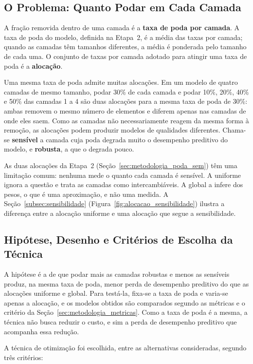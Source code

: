 \subsection{O Problema: Quanto Podar em Cada Camada}

A fração removida dentro de uma camada é a \textbf{taxa de poda por camada}. A taxa de poda
do modelo, definida na Etapa~2, é a média das taxas por camada; quando as camadas têm
tamanhos diferentes, a média é ponderada pelo tamanho de cada uma. O conjunto de taxas por
camada adotado para atingir uma taxa de poda é a \textbf{alocação}.

Uma mesma taxa de poda admite muitas alocações. Em um modelo de quatro camadas de mesmo
tamanho, podar 30\% de cada camada e podar 10\%, 20\%, 40\% e 50\% das camadas 1 a 4 são
duas alocações para a mesma taxa de poda de 30\%: ambas removem o mesmo número de elementos
e diferem apenas nas camadas de onde eles saem. Como as camadas não necessariamente reagem
da mesma forma à remoção, as alocações podem produzir modelos de qualidades diferentes.
Chama-se \textbf{sensível} a camada cuja poda degrada muito o desempenho preditivo do
modelo, e \textbf{robusta}, a que o degrada pouco.

As duas alocações da Etapa~2 (Seção~\ref{sec:metodologia_poda_sem}) têm uma limitação
comum: nenhuma mede o quanto cada camada é sensível. A uniforme ignora a questão e trata as
camadas como intercambiáveis. A global a infere dos pesos, o que é uma aproximação, e não
uma medida. A Seção~\ref{subsec:sensibilidade} (Figura~\ref{fig:alocacao_sensibilidade})
ilustra a diferença entre a alocação uniforme e uma alocação que segue a sensibilidade.

\subsection{Hipótese, Desenho e Critérios de Escolha da Técnica}

A hipótese é a de que podar mais as camadas robustas e menos as sensíveis produz, na mesma
taxa de poda, menor perda de desempenho preditivo do que as alocações uniforme e global.
Para testá-la, fixa-se a taxa de poda e varia-se apenas a alocação, e os modelos obtidos
são comparados segundo as métricas e o critério da Seção~\ref{sec:metodologia_metricas}.
Como a taxa de poda é a mesma, a técnica não busca reduzir o custo, e sim a perda de
desempenho preditivo que acompanha essa redução.

A técnica de otimização foi escolhida, entre as alternativas consideradas, segundo três
critérios:

